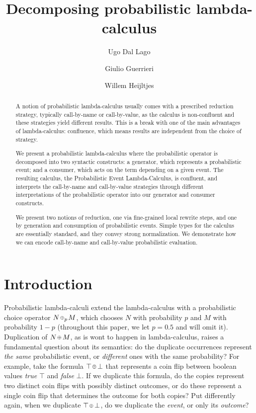 \documentclass{llncs}
\title{Decomposing probabilistic lambda-calculus}
\author{
	 Ugo Dal Lago\inst1
\and Giulio Guerrieri\inst2
\and Willem Heijltjes\inst2
}
\institute{%
Dipartimento di Informatica - Scienza e Ingegneria\\ Universit\`a di Bologna, Bologna, Italy\\
\email{ugo.dallago@unibo.it}\\[10pt]
\and%
Department of Computer Science\\ University of Bath, Bath, UK\\
\email{\{w.b.heijltjes,g.guerrieri\}@bath.ac.uk}
}
\theoremstyle{definition}
\theoremstyle{plain}
\newcommand\+[1][{}]{\kern1pt{\smallbin\oplus}_{#1}\kern1pt}
\begin{document}
\maketitle

\begin{abstract}
A notion of probabilistic lambda-calculus usually comes with a prescribed reduction strategy, typically call-by-name or call-by-value, as the calculus is non-confluent and these strategies yield different results. This is a break with one of the main advantages of lambda-calculus: confluence, which means results are independent from the choice of strategy.

We present a probabilistic lambda-calculus where the probabilistic operator is decomposed into two syntactic constructs: a generator, which represents a probabilistic event; and a consumer, which acts on the term depending on a given event. The resulting calculus, the Probabilistic Event Lambda-Calculus, is confluent, and interprets the call-by-name and call-by-value strategies through different interpretations of the probabilistic operator into our generator and consumer constructs.

We present two notions of reduction, one via fine-grained local rewrite steps, and one by generation and consumption of probabilistic events. Simple types for the calculus are essentially standard, and they convey strong normalization. We demonstrate how we can encode call-by-name and call-by-value probabilistic evaluation.
\end{abstract}

\section{Introduction}

Probabilistic lambda-calculi \cite{SahebDjahromi78,...,FaggianRonchi19} extend the lambda-calculus with a probabilistic choice operator $N\+[p]M$, which chooses $N$ with probability $p$ and $M$ with probability $1-p$ (throughout this paper, we let $p=0.5$ and will omit it). Duplication of $N\+M$, as is wont to happen in lambda-calculus, raises a fundamental question about its semantics: do the duplicate occurrences represent \emph{the same} probabilistic event, or \emph{different} ones with the same probability? For example, take the formula $\top\+\bot$ that represents a coin flip between boolean values \emph{true} $\top$ and \emph{false} $\bot$. If we duplicate this formula, do the copies represent two distinct coin flips with possibly distinct outcomes, or do these represent a single coin flip that determines the outcome for both copies? Put differently again, when we duplicate $\top\+\bot$, do we duplicate the \emph{event}, or only its \emph{outcome}?
\end{document}
